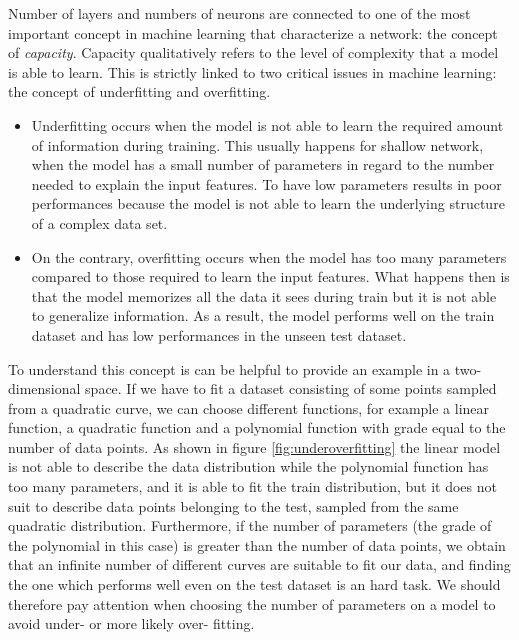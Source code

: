 \documentclass[11pt]{report}
\begin{document}
Number of layers and numbers of neurons are connected to one of the most important concept in machine learning that characterize a network: the concept of \emph{capacity}.
Capacity qualitatively refers to the level of complexity that a model is able to learn.
This is strictly linked to two critical issues in machine learning: the concept of underfitting and overfitting.
\begin{itemize}
\item Underfitting occurs when the model is not able to learn the required amount of information during training.
This usually happens for shallow network, when the model has a small number of parameters in regard to the number needed to explain the input features.
To have low parameters results in poor performances because the model is not able to learn the underlying structure of a complex data set.

\item On the contrary, overfitting occurs when the model has too many parameters compared to those required to learn the input features.
What happens then is that the model memorizes all the data it sees during train but it is not able to generalize information.
As a result, the model performs well on the train dataset and has low performances in the unseen test dataset.
\end{itemize}

To understand this concept is can be helpful to provide an example in a two-dimensional space.
If we have to fit a dataset consisting of some points sampled from a quadratic curve, we can choose different functions, for example a linear function, a quadratic function and a polynomial function with grade equal to the number of data points.
As shown in figure \ref{fig:underoverfitting} the linear model is not able to describe the data distribution while the polynomial function has too many parameters, and it is able to fit the train distribution, but it does not suit to describe data points belonging to the test, sampled from the same quadratic distribution.
Furthermore, if the number of parameters (the grade of the polynomial in this case) is greater than the number of data points, we obtain that an infinite number of different curves are suitable to fit our data, and finding the one which performs well even on the test dataset is an hard task.
We should therefore pay attention when choosing the number of parameters on a model to avoid under- or more likely over- fitting.
\end{document}
